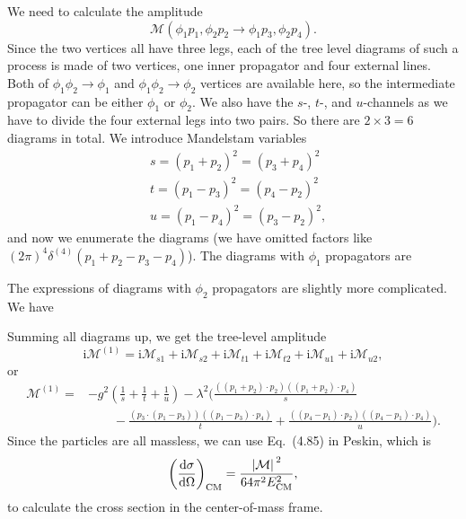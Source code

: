 \documentclass[hyperref, a4paper]{article}
\newcommand*{\ii}{\mathrm{i}}
\begin{document}
We need to calculate the amplitude
\[
    \mathcal{M}(\phi_1 p_1, \phi_2 p_2 \to \phi_1 p_3, \phi_2 p_4).
\]
Since the two vertices all have three legs, each of the tree level diagrams of such a process is made of two vertices, one inner propagator and four external lines.
Both of $\phi_1 \phi_2 \to \phi_1$ and $\phi_1 \phi_2 \to \phi_2$ vertices are available here, 
so the intermediate propagator can be either $\phi_1$ or $\phi_2$.
We also have the $s$-, $t$-, and $u$-channels as we have to divide the four external legs into two pairs.
So there are $2 \times 3 = 6$ diagrams in total. 
We introduce Mandelstam variables
\begin{equation}
    \begin{aligned}
        &s=\left(p_{1}+p_{2}\right)^{2}=\left(p_{3}+p_{4}\right)^{2} \\
        &t=\left(p_{1}-p_{3}\right)^{2}=\left(p_{4}-p_{2}\right)^{2} \\
        &u=\left(p_{1}-p_{4}\right)^{2}=\left(p_{3}-p_{2}\right)^{2},
        \end{aligned}
\end{equation} 
and now we enumerate the diagrams (we have omitted factors like $(2\pi)^4 \delta^{(4)}(p_1 + p_2 - p_3 - p_4)$).
The diagrams with $\phi_1$ propagators are 



The expressions of diagrams with $\phi_2$ propagators are slightly more complicated. We have 



Summing all diagrams up, we get the tree-level amplitude
\[
    \ii \mathcal{M}^{(1)} = \ii \mathcal{M}_{s1} + \ii \mathcal{M}_{s2} + \ii \mathcal{M}_{t1} + \ii \mathcal{M}_{t2} + \ii \mathcal{M}_{u1} + \ii \mathcal{M}_{u2} ,
\]
or 
\begin{equation}
    \begin{aligned}
        \mathcal{M}^{(1)} = &- g^2 \left( \frac{1}{s} + \frac{1}{t} + \frac{1}{u} \right) - \lambda^2 \Biggl( \frac{ ((p_1 + p_2) \cdot p_2)((p_1 + p_2) \cdot p_4)}{s } \\
        &\quad \quad - \frac{ (p_3 \cdot (p_1 - p_3))((p_1 - p_3) \cdot p_4)}{t } + \frac{ ((p_4 - p_1) \cdot p_2)((p_4 - p_1) \cdot p_4)}{u } \Biggr).
    \end{aligned}
\end{equation}
Since the particles are all massless, we can use Eq.~(4.85) in Peskin, which is 
\begin{equation}
    \left(\dv{\sigma}{\Omega}\right)_\text{CM} = \frac{\abs*{\mathcal{M}}^2}{64 \pi^2 E_\text{CM}^2},  
\end{equation}
to calculate the cross section in the center-of-mass frame.
\end{document}
